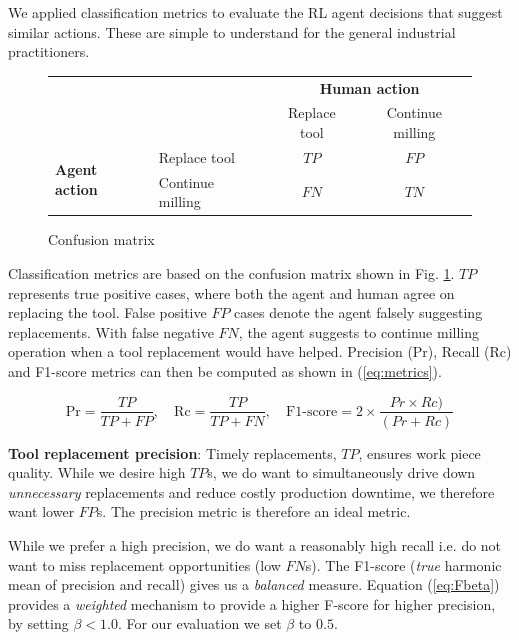 \documentclass[a4paper, 12pt]{article}
\newcommand{\rowspace}[1]{\renewcommand{\arraystretch}{#1}}
\begin{document}
We applied classification metrics to evaluate the RL agent decisions that suggest similar actions. These are simple to understand for the general industrial practitioners. 
\begin{figure}
	\begin{center}
		\sffamily
		\rowspace{1.6}
		\begin{tabular}{l|l|c|c|}
			\multicolumn{2}{c}{}&\multicolumn{2}{c}{\textbf{Human action}}\\
			\cline{3-4}
			\multicolumn{2}{c|}{}&Replace tool&Continue milling\\
			\cline{2-4}
			\multirow{2}{*}{\textbf{Agent action}}& Replace tool & $TP$ & $FP$\\
			\cline{2-4}
			& Continue milling& $FN$ & $TN$\\
			\cline{2-4}
		\end{tabular}
	\end{center}
	\caption{Confusion matrix }
	\label{fig:CM}	
\end{figure}
Classification metrics are based on the confusion matrix shown in Fig. \ref{fig:CM}. $TP$ represents true positive cases, where both the agent and human agree on replacing the tool. False positive $FP$ cases denote the agent falsely suggesting replacements. With false negative $FN$, the agent suggests to continue milling operation when a tool replacement would have helped. Precision (Pr), Recall (Rc) and F1-score metrics can then be computed as shown in (\ref{eq:metrics}).

\begin{equation}
	\text{Pr} = \frac{TP}{TP+FP}, \quad
	\text{Rc} = \frac{TP}{TP+FN}, \quad
	\text{F1-score} = 2 \times \frac{Pr \times Rc)}{(Pr + Rc)}
	\label{eq:metrics}
\end{equation}

\textbf{Tool replacement precision}: Timely replacements, $TP$, ensures work piece quality. While we desire high $TP$s, we do want to simultaneously drive down \textit{unnecessary} replacements and reduce costly production downtime, we therefore want lower $FP$s. The precision metric is therefore an ideal metric. 

While we prefer a high precision, we do want a reasonably high recall i.e. do not want to miss replacement opportunities (low $FN$s). The F1-score (\textit{true} harmonic mean of precision and recall) gives us a \textit{balanced} measure. Equation (\ref{eq:Fbeta}) provides a \textit{weighted} mechanism to provide a higher F-score for higher precision, by setting $\beta < 1.0$. For our evaluation we set $\beta$ to $0.5$.
\end{document}
